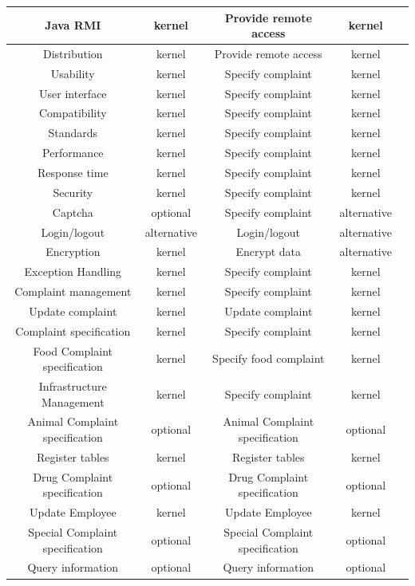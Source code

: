 \documentclass[11pt,twoside]{article}
\begin{document}
\begin{center}
\begin{footnotesize}
\begin{tabular}{c|c|c|c|c}
Java RMI & kernel & Provide remote access & kernel & \\  \hline
Distribution & kernel & Provide remote access & kernel & \\  \hline
Usability & kernel & Specify complaint & kernel & \\  \hline
User interface & kernel & Specify complaint & kernel & \\  \hline
Compatibility & kernel & Specify complaint & kernel & \\  \hline
Standards & kernel & Specify complaint & kernel & \\  \hline
Performance & kernel & Specify complaint & kernel & \\  \hline
Response time & kernel & Specify complaint & kernel & \\  \hline
Security & kernel & Specify complaint & kernel & \\  \hline
Captcha & optional & Specify complaint & alternative \\ \hline
Login/logout & alternative & Login/logout & alternative & \\ \hline
Encryption & kernel & Encrypt data & alternative & \\  \hline
Exception Handling & kernel & Specify complaint & kernel & \\  \hline
Complaint management & kernel & Specify complaint & kernel & \\ \hline
Update complaint & kernel & Update complaint & kernel & \\ \hline
Complaint specification & kernel & Specify complaint & kernel & \\ \hline
Food Complaint specification & kernel & Specify food complaint & kernel & \\ \hline
Infrastructure Management & kernel & Specify complaint & kernel & \\ \hline
Animal Complaint specification & optional & Animal Complaint specification  & optional & \\ \hline
Register tables & kernel & Register tables & kernel & \\ \hline
Drug Complaint specification & optional & Drug Complaint specification & optional & \\ \hline
Update Employee & kernel & Update Employee & kernel & \\ \hline
Special Complaint specification & optional & Special Complaint specification & optional & \\ \hline
Query information & optional & Query information  & optional & \\ \hline

\end{tabular}
\end{footnotesize}
\end{center}
\end{document}
